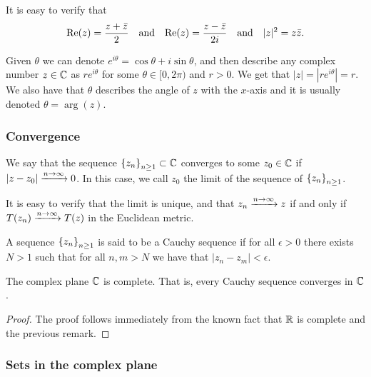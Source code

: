 \documentclass[11pt,a4paper]{article}
\begin{document}
\begin{remark}
It is easy to verify that
\[
  \mathrm{Re}(z) = \frac{z + \bar{z}}{2} \quad \text{and} \quad 
  \mathrm{Re}(z) = \frac{z - \bar{z}}{2 i} \quad \text{and} \quad
  |z|^2 = z \bar{z}.
\]

Given $\theta$ we can denote $e^{i \theta} = \cos \theta + i \sin \theta$,
and then describe any complex number $z \in \mathbb{C}$ as $r e^{i \theta}$
for some $\theta \in [0, 2\pi)$ and $r > 0$.
We get that $|z| = |r e^{i \theta}| = r$.
We also have that $\theta$ describes the angle of $z$ with the $x$-axis
and it is usually denoted $\theta = \arg(z)$.
\end{remark}

\subsubsection{Convergence}

\begin{definition}[Convergence]
  We say that the sequence $\left\{z_n\right\}_{n \geq 1} \subset \mathbb{C}$ converges
  to some $z_0 \in \mathbb{C}$ if $|z - z_0| \xrightarrow{n \to \infty} 0$.
  In this case, we call $z_0$ the limit of the sequence of
  $\left\{z_n\right\}_{n \geq 1}$.
\end{definition}

\begin{remark}
  It is easy to verify that the limit is unique, and that
  $z_n \xrightarrow{n \to \infty} z$ if and only if
  $T(z_n) \xrightarrow{n \to \infty} T(z)$ in the Euclidean metric.
\end{remark}

\begin{definition}
  A sequence $\left\{z_n\right\}_{n \geq 1}$ is said to be a Cauchy sequence if for
  all $\epsilon > 0$ there exists $N > 1$ such that for all $n,m > N$
  we have that $|z_n - z_m| < \epsilon$.
\end{definition}

\begin{proposition}
  The complex plane $\mathbb{C}$ is complete.
  That is, every Cauchy sequence converges in $\mathbb{C}$.
\end{proposition}
\begin{proof}
  The proof follows immediately from the known fact that $\mathbb{R}$ is complete
  and the previous remark.
\end{proof}

\subsubsection{Sets in the complex plane}
\end{document}
